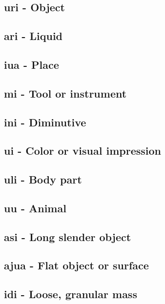 \subsection{\rootpart{}ur\rootpart{}i - Object}

\subsection{\rootpart{}ar\rootpart{}i - Liquid}

\subsection{i\rootpart{}u\rootpart{}a - Place}

\subsection{m\rootpart{}i\rootpart{} - Tool or instrument}

\subsection{in\rootpart{}i\rootpart{} - Diminutive}

\subsection{\rootpart{}u\rootpart{}i - Color or visual impression}

\subsection{\rootpart{}uli\rootpart{} - Body part}

\subsection{\rootpart{}u\rootpart{}u - Animal}

\subsection{\rootpart{}asi\rootpart{} - Long slender object}

\subsection{\rootpart{}aju\rootpart{}a - Flat object or surface}

\subsection{\rootpart{}idi\rootpart{} - Loose, granular mass}

